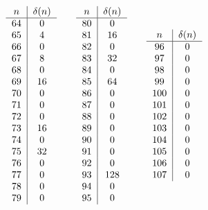 \documentclass[12pt]{amsart}
\theoremstyle{definition}
\numberwithin{equation}{section}
\begin{document}
\[
\begin{tabular}{c|c}
$n$ & $\delta(n)$\\
\hline
64 & 0\\ 65 & 4\\ 66 & 0\\ 67 & 8\\ 68 & 0\\ 69 & 16\\ 70  &  0\\
71  &  0\\
72  &  0\\73  &  16\\74  &  0\\75  &  32\\76  &  0\\77  &  0\\78  &  0\\79  &  0
\end{tabular}\qquad 
\begin{tabular}{c|c}
    $n$ & $\delta(n)$\\
     \hline
     80  &  0\\ 81  &  16\\82  &  0\\83  &  32\\84  &  0\\85  &  64\\86  &  0\\87  &  0\\88  &  0\\89  &  0\\90  &  0\\91  &  0\\92  &  0\\93  &  128\\94  &  0\\95  &  0
\end{tabular}\qquad
\begin{tabular}{c|c}
$n$ & $\delta(n)$\\
\hline
96  &  0\\97  &  0\\98  &  0\\99  &  0\\100  &  0\\101  &  0\\102  &  0\\103  &  0\\104  &  0\\105  &  0\\106  &  0\\107  &  0\\

\end{tabular}\]
\end{document}
